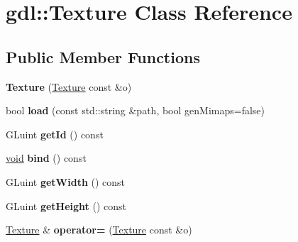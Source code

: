 \hypertarget{classgdl_1_1_texture}{}\section{gdl\+:\+:Texture Class Reference}
\label{classgdl_1_1_texture}
\subsection*{Public Member Functions}
\begin{DoxyCompactItemize}
\item 
\hypertarget{classgdl_1_1_texture_a2d010f85c81be8c5b19cf7b4f0ae1af0}{}{\bfseries Texture} (\hyperlink{classgdl_1_1_texture}{Texture} const \&o)\label{classgdl_1_1_texture_a2d010f85c81be8c5b19cf7b4f0ae1af0}

\item 
\hypertarget{classgdl_1_1_texture_ada7dffc24ec794f7cc5a5a26dc0261fc}{}bool {\bfseries load} (const std\+::string \&path, bool gen\+Mimaps=false)\label{classgdl_1_1_texture_ada7dffc24ec794f7cc5a5a26dc0261fc}

\item 
\hypertarget{classgdl_1_1_texture_a1954740f65f3e9265d6f4506ec75f4c2}{}G\+Luint {\bfseries get\+Id} () const \label{classgdl_1_1_texture_a1954740f65f3e9265d6f4506ec75f4c2}

\item 
\hypertarget{classgdl_1_1_texture_a5b628612f89e1fc67a28085158236d9c}{}\hyperlink{_s_d_l__audio_8h_a52835ae37c4bb905b903cbaf5d04b05f}{void} {\bfseries bind} () const \label{classgdl_1_1_texture_a5b628612f89e1fc67a28085158236d9c}

\item 
\hypertarget{classgdl_1_1_texture_a932fca1cf9da4570df0591ae2272f545}{}G\+Luint {\bfseries get\+Width} () const \label{classgdl_1_1_texture_a932fca1cf9da4570df0591ae2272f545}

\item 
\hypertarget{classgdl_1_1_texture_a7ffaf22e021293cab2a856c2ec795dca}{}G\+Luint {\bfseries get\+Height} () const \label{classgdl_1_1_texture_a7ffaf22e021293cab2a856c2ec795dca}

\item 
\hypertarget{classgdl_1_1_texture_a54bb80c56d1969ed6deb69810a82a6ca}{}\hyperlink{classgdl_1_1_texture}{Texture} \& {\bfseries operator=} (\hyperlink{classgdl_1_1_texture}{Texture} const \&o)\label{classgdl_1_1_texture_a54bb80c56d1969ed6deb69810a82a6ca}

\end{DoxyCompactItemize}

